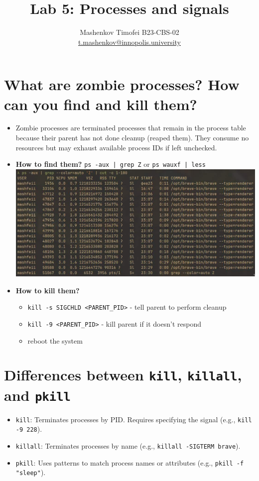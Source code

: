 \documentclass{article}
\title{Lab 5: Processes and signals}
\author{Mashenkov Timofei B23-CBS-02 \\ \href{mailto:t.mashenkov@innopolis.university}{t.mashenkov@innopolis.university}}
\newcommand{\code}[1]{\colorbox{light-gray}{\texttt{#1}}}
\begin{document}
\maketitle{}

\section{What are zombie processes? How can you find and kill them?}
\noindent

\begin{itemize}
	\item Zombie processes are terminated processes that remain in the process table because their parent has not done cleanup (reaped them). They consume no resources but may exhaust available process IDs if left unchecked.
	\item \textbf{How to find them?} \code{ps -aux | grep Z} or \code{ps wauxf | less} \\ \includegraphics[width=460pt]{5_1.jpg}
	\item \textbf{How to kill them?}
	      \begin{itemize}
		      \item \code{kill -s SIGCHLD <PARENT\_PID>} - tell parent to perform cleanup
		      \item \code{kill -9 <PARENT\_PID>} - kill parent if it doesn't respond
		      \item reboot the system
	      \end{itemize}
\end{itemize}

\section{Differences between \code{kill}, \code{killall}, and \code{pkill}}
\noindent

\begin{itemize}
	\item \code{kill}: Terminates processes by PID. Requires specifying the signal (e.g., \code{kill -9 228}).
	\item \code{killall}: Terminates processes by name (e.g., \code{killall -SIGTERM brave}).
	\item \code{pkill}: Uses patterns to match process names or attributes (e.g., \code{pkill -f "sleep"}).
\end{itemize}
\end{document}
